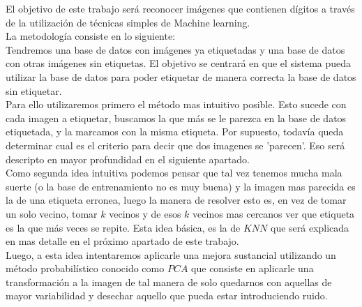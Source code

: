 El objetivo de este trabajo será reconocer imágenes que contienen dígitos a través de la utilización de técnicas simples de Machine learning.
\\
La metodología consiste en lo siguiente: 
\\
Tendremos una base de datos con imágenes ya etiquetadas y una base de datos con otras imágenes sin etiquetas. El objetivo se centrará en que el sistema pueda utilizar la base de datos para poder etiquetar de manera correcta la base de datos sin etiquetar.
\\
Para ello utilizaremos primero el método mas intuitivo posible. Esto sucede con cada imagen a etiquetar, buscamos la que más se le parezca en la base de datos etiquetada, y la marcamos con la misma etiqueta. Por supuesto, todavía queda determinar cual es el criterio para decir que dos imagenes se 'parecen'. Eso será descripto en mayor profundidad en el siguiente apartado.
\\
Como segunda idea intuitiva podemos pensar que tal vez tenemos mucha mala suerte (o la base de entrenamiento no es muy buena) y la imagen mas parecida es la de una etiqueta erronea, luego la manera de resolver esto es, en vez de tomar un solo vecino, tomar $k$ vecinos y de esos $k$ vecinos mas cercanos ver que etiqueta es la que más veces se repite. Esta idea básica, es la de $KNN$ que será explicada en mas detalle en el próximo apartado de este trabajo.
\\
Luego, a esta idea intentaremos aplicarle una mejora sustancial utilizando un método probabilístico conocido como $PCA$ que consiste en aplicarle una transformación a la imagen de tal manera de solo quedarnos con aquellas de mayor variabilidad y desechar aquello que pueda estar introduciendo ruido.
